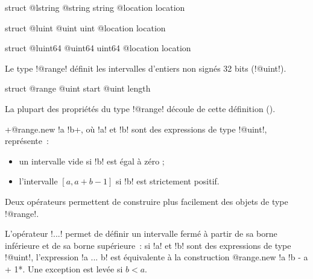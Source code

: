 
\begin{galgas}
struct @lstring {
  @string string
  @location location
}
\end{galgas}








\begin{galgas}
struct @luint {
  @uint uint
  @location location
}
\end{galgas}







\begin{galgas}
struct @luint64 {
  @uint64 uint64
  @location location
}
\end{galgas}



Le type \ggs!@range! définit les intervalles d'entiers non signés 32 bits (\ggs!@uint!).

\begin{galgas}
struct @range {
  @uint start
  @uint length
}
\end{galgas}

La plupart des propriétés du type \ggs!@range! découle de cette définition ().

\ggs+@range.new {!a !b}+, où \ggs!a! et \ggs!b! sont des expressions de type \ggs!@uint!, représente~:
\begin{itemize}
  \item un intervalle vide si \ggs!b! est égal à zéro ;
  \item l'intervalle $[a, a+b-1]$ si \ggs!b! est strictement positif.
\end{itemize}




Deux opérateurs permettent de construire plus facilement des objets de type \ggs!@range!.

L'opérateur \ggs!...! permet de définir un intervalle fermé à partir de sa borne inférieure et de sa borne supérieure~: si \ggs!a! et \ggs!b! sont des expressions de type \ggs!@uint!, l'expression \ggs!a ... b! est équivalente à la construction \ggs*@range.new {!a !b - a + 1}*. Une exception est levée si $b < a$. 

